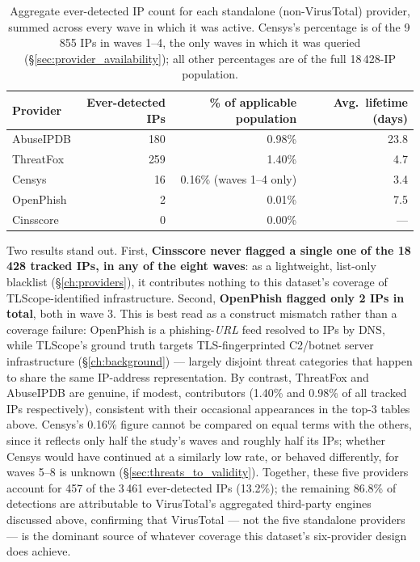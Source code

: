 \documentclass[12pt, a4paper, twoside]{report}
\begin{document}
\begin{table}[h]
  \centering
  \caption{Aggregate ever-detected IP count for each standalone (non-VirusTotal) provider, summed
    across every wave in which it was active. Censys's percentage is of the 9\,855 IPs in waves
    1--4, the only waves in which it was queried (\S\ref{sec:provider_availability}); all other
    percentages are of the full 18\,428-IP population.}
  \label{tab:provider_coverage}
  \begin{tabular}{lrrr}
    \toprule
    \textbf{Provider} & \textbf{Ever-detected IPs} & \textbf{\% of applicable population} & \textbf{Avg.\ lifetime (days)} \\
    \midrule
    AbuseIPDB  & 180 & 0.98\%                  & 23.8 \\
    ThreatFox  & 259 & 1.40\%                  & 4.7  \\
    Censys     & 16  & 0.16\% (waves 1--4 only) & 3.4  \\
    OpenPhish  & 2   & 0.01\%                  & 7.5  \\
    Cinsscore  & 0   & 0.00\%                  & ---  \\
    \bottomrule
  \end{tabular}
\end{table}

Two results stand out. First, \textbf{Cinsscore never flagged a single one of the 18\,428 tracked
IPs, in any of the eight waves}: as a lightweight, list-only blacklist (\S\ref{ch:providers}), it
contributes nothing to this dataset's coverage of TLScope-identified infrastructure. Second,
\textbf{OpenPhish flagged only 2 IPs in total}, both in wave 3. This is best read as a construct
mismatch rather than a coverage failure: OpenPhish is a phishing-\emph{URL} feed resolved to IPs by
DNS, while TLScope's ground truth targets TLS-fingerprinted C2/botnet server infrastructure
(\S\ref{ch:background}) --- largely disjoint threat categories that happen to share the same
IP-address representation. By contrast, ThreatFox and AbuseIPDB are genuine, if modest, contributors
(1.40\% and 0.98\% of all tracked IPs respectively), consistent with their occasional appearances in
the top-3 tables above. Censys's 0.16\% figure cannot be compared on equal terms with the others,
since it reflects only half the study's waves and roughly half its IPs; whether Censys would have
continued at a similarly low rate, or behaved differently, for waves 5--8 is unknown
(\S\ref{sec:threats_to_validity}). Together, these five providers account for 457 of the 3\,461
ever-detected IPs (13.2\%); the remaining 86.8\% of detections are attributable to VirusTotal's
aggregated third-party engines discussed above, confirming that VirusTotal --- not the five
standalone providers --- is the dominant source of whatever coverage this dataset's six-provider
design does achieve.
\end{document}
